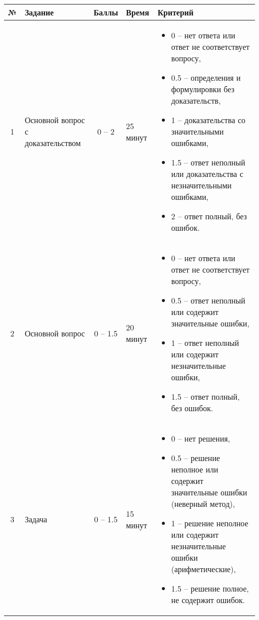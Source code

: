 \documentclass[a4paper,12pt]{article}
\begin{document}
\begin{center}
    \begin{tabular}{|c|p{2cm}|c|l|p{9cm}|}
        \hline
        № & Задание                           & Баллы    & Время    & Критерий \\
        \hline
        1 & Основной вопрос с доказательством & 0 -- 2   & 25 минут &
        \begin{itemize}
            \item 0 -- нет ответа или ответ не соответствует вопросу,
            \item 0.5 -- определения и формулировки без доказательств,
            \item 1 -- доказательства со значительными ошибками,
            \item 1.5 -- ответ неполный или доказательства с незначительными ошибками,
            \item 2 -- ответ полный, без ошибок.
        \end{itemize}
        \\
        \hline
        2 & Основной вопрос                   & 0 -- 1.5 & 20 минут &
        \begin{itemize}
            \item 0 -- нет ответа или ответ не соответствует вопросу,
            \item 0.5 -- ответ неполный или содержит значительные ошибки,
            \item 1 -- ответ неполный или содержит незначительные ошибки,
            \item 1.5 -- ответ полный, без ошибок.
        \end{itemize}
        \\
        \hline
        3 & Задача                            & 0 -- 1.5 & 15 минут &
        \begin{itemize}
            \item 0 -- нет решения,
            \item 0.5 -- решение неполное или содержит значительные ошибки (неверный метод),
            \item 1 -- решение неполное или содержит незначительные ошибки (арифметические),
            \item 1.5 -- решение полное, не содержит ошибок.
        \end{itemize}
        \\
        \hline
    \end{tabular}
\end{center}
\end{document}

